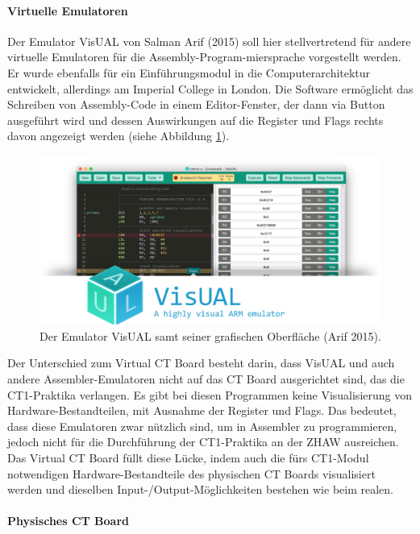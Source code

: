 \documentclass[10pt]{article}
\begin{document}
\paragraph{Virtuelle Emulatoren}
Der Emulator VisUAL von Salman Arif (2015) soll hier stellvertretend für andere virtuelle Emulatoren für die Assembly-Program-miersprache vorgestellt werden. Er wurde ebenfalls für ein Einführungsmodul in die Computerarchitektur entwickelt, allerdings am Imperial College in London. Die Software ermöglicht das Schreiben von Assembly-Code in einem Editor-Fenster, der dann via Button ausgeführt wird und dessen Auswirkungen auf die Register und Flags rechts davon angezeigt werden (siehe Abbildung \ref{emulator}).
\begin{figure}[h]
\includegraphics[width=\textwidth]{visual_emulator}
\caption{Der Emulator VisUAL samt seiner grafischen Oberfläche (Arif 2015).}
\label{emulator}
\end{figure}
Der Unterschied zum \glqq Virtual CT Board\grqq{} besteht darin, dass VisUAL und auch andere Assembler-Emulatoren nicht auf das CT Board ausgerichtet sind, das die CT1-Praktika verlangen. Es gibt bei diesen Programmen keine Visualisierung von Hardware-Bestandteilen, mit Ausnahme der Register und Flags. Das bedeutet, dass diese Emulatoren zwar nützlich sind, um in Assembler zu programmieren, jedoch nicht für die Durchführung der CT1-Praktika an der ZHAW ausreichen. Das \glqq Virtual CT Board\grqq{} füllt diese Lücke, indem auch die fürs CT1-Modul notwendigen Hardware-Bestandteile des physischen CT Boards visualisiert werden und dieselben Input-/Output-Möglichkeiten bestehen wie beim realen.

\paragraph{Physisches CT Board} 
\end{document}
